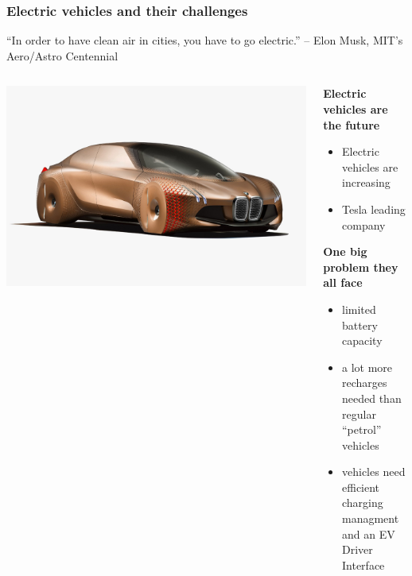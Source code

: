 \begin{frame}
\frametitle{Electric vehicles and their challenges}

	``In order to have clean air in cities, you have to go electric.'' – Elon Musk, MIT's Aero/Astro Centennial

	\begin{columns}
		\begin{column}{0.4\textwidth}
		    \vspace{3mm}
			\begin{center}
				\includegraphics[scale=0.2]{images/bmw1.png}
			\end{center}
		\end{column}
		\begin{column}{0.6\textwidth}
		    \vspace{4mm}

			\textbf{Electric vehicles are the future}
			\begin{itemize}
				\item	Electric vehicles are increasing
				\item 	Tesla leading company
			\end{itemize}

			\vspace{8mm}

			\textbf{One big problem they all face}
			\begin{itemize}
				\item limited battery capacity
				\item a lot more recharges needed than regular\\``petrol'' vehicles
				\item vehicles need efficient charging managment\\and an EV Driver Interface
			\end{itemize}
		\end{column}
	\end{columns}

\end{frame}
\clearpage



